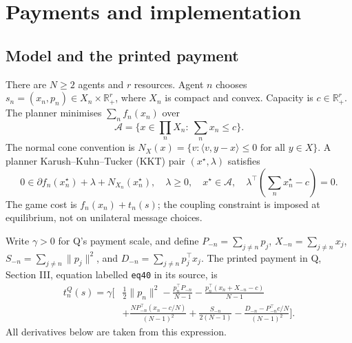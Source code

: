 \documentclass{article}
\begin{document}
\section{Payments and implementation}
\subsection{Model and the printed payment}
There are \(N\ge2\) agents and \(r\) resources. Agent \(n\) chooses
\(s_n=(x_n,p_n)\in X_n\times\mathbb R_+^r\), where \(X_n\) is compact
and convex. Capacity is \(c\in\mathbb R_+^r\). The planner minimises
\(\sum_n f_n(x_n)\) over
\[
 \mathcal A=\{x\in\textstyle\prod_n X_n:\ \sum_nx_n\le c\}.
\]
The normal cone convention is
\(N_X(x)=\{v:\langle v,y-x\rangle\le0\text{ for all }y\in X\}\).
A planner Karush--Kuhn--Tucker (KKT) pair \((x^\star,\lambda)\) satisfies
\begin{equation}\label{eq:kkt}
 0\in\partial f_n(x_n^\star)+\lambda+N_{X_n}(x_n^\star),\quad
 \lambda\ge0,\quad x^\star\in\mathcal A,\quad
 \lambda^\top(\sum_nx_n^\star-c)=0.
\end{equation}
The game cost is \(f_n(x_n)+t_n(s)\); the coupling constraint is imposed
at equilibrium, not on unilateral message choices.

Write \(\gamma>0\) for Q's payment scale, and define
\(P_{-n}=\sum_{j\ne n}p_j\), \(X_{-n}=\sum_{j\ne n}x_j\),
\(S_{-n}=\sum_{j\ne n}\|p_j\|^2\), and
\(D_{-n}=\sum_{j\ne n}p_j^\top x_j\).
The printed payment in Q, Section III, equation labelled
\texttt{eq40} in its source, is
\begin{equation}\label{eq:tax}
\begin{aligned}
 t_n^Q(s)=\gamma\bigg[&\frac12\|p_n\|^2
 -\frac{p_n^\top P_{-n}}{N-1}
 -\frac{p_n^\top(x_n+X_{-n}-c)}{N-1}\\
 &+\frac{N P_{-n}^\top(x_n-c/N)}{(N-1)^2}
 +\frac{S_{-n}}{2(N-1)}
 -\frac{D_{-n}-P_{-n}^\top c/N}{(N-1)^2}\bigg].
\end{aligned}
\end{equation}
All derivatives below are taken from this expression.
\end{document}
